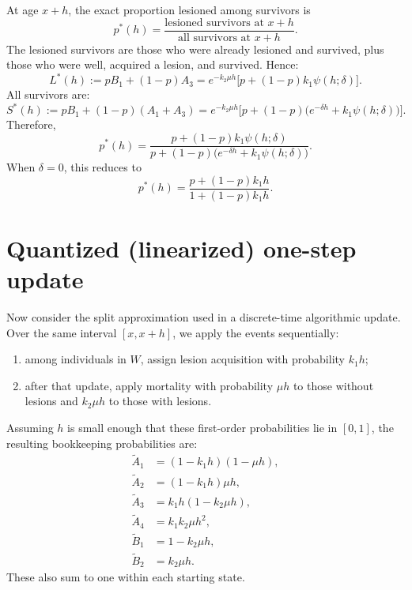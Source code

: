 \documentclass{article}
\begin{document}
At age \(x+h\), the exact proportion lesioned among survivors is
\[
p^\ast(h)
=
\frac{\text{lesioned survivors at }x+h}
{\text{all survivors at }x+h}.
\]
The lesioned survivors are those who were already lesioned and survived, plus those who were well, acquired a lesion, and survived. Hence:
\[
L^\ast(h):=pB_1+(1-p)A_3
= e^{-k_2\mu h}\bigl[p+(1-p)k_1\psi(h;\delta)\bigr].
\]
All survivors are:
\[
S^\ast(h):=pB_1+(1-p)(A_1+A_3)
= e^{-k_2\mu h}\bigl[p+(1-p)\bigl(e^{-\delta h}+k_1\psi(h;\delta)\bigr)\bigr].
\]
Therefore,
\begin{equation}
\label{eq:pexact}
p^\ast(h)
=
\frac{p+(1-p)k_1\psi(h;\delta)}
{p+(1-p)\bigl(e^{-\delta h}+k_1\psi(h;\delta)\bigr)}.
\end{equation}
When \(\delta=0\), this reduces to
\[
p^\ast(h)
=
\frac{p+(1-p)k_1 h}{1+(1-p)k_1 h}.
\]

\section*{Quantized (linearized) one-step update}

Now consider the split approximation used in a discrete-time algorithmic update. Over the same interval \([x,x+h]\), we apply the events sequentially:

\begin{enumerate}
\item among individuals in \(W\), assign lesion acquisition with probability \(k_1 h\);
\item after that update, apply mortality with probability \(\mu h\) to those without lesions and \(k_2\mu h\) to those with lesions.
\end{enumerate}

Assuming \(h\) is small enough that these first-order probabilities lie in \([0,1]\), the resulting bookkeeping probabilities are:
\begin{align}
\widetilde A_1 &= (1-k_1 h)(1-\mu h), \label{eq:A1_tilde}\\
\widetilde A_2 &= (1-k_1 h)\mu h, \label{eq:A2_tilde}\\
\widetilde A_3 &= k_1 h(1-k_2\mu h), \label{eq:A3_tilde}\\
\widetilde A_4 &= k_1k_2\mu h^2, \label{eq:A4_tilde}\\
\widetilde B_1 &= 1-k_2\mu h, \label{eq:B1_tilde}\\
\widetilde B_2 &= k_2\mu h. \label{eq:B2_tilde}
\end{align}
These also sum to one within each starting state.
\end{document}
